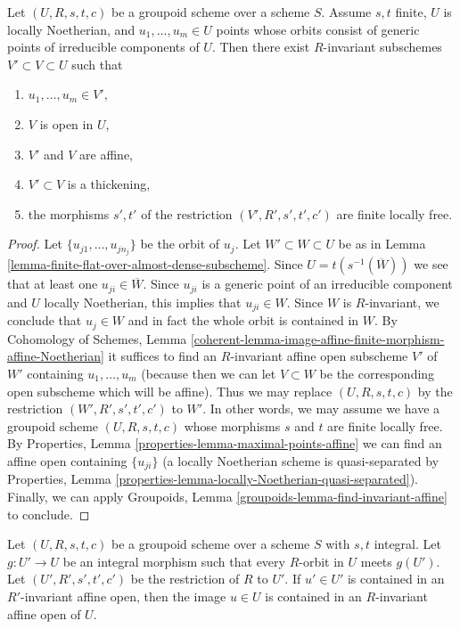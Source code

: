 \begin{lemma}
\label{lemma-invariant-affine-open-around-generic-point-Noetherian}
Let $(U, R, s, t, c)$ be a groupoid scheme over a scheme $S$.
Assume $s, t$ finite, $U$ is locally Noetherian, and $u_1, \ldots, u_m \in U$
points whose orbits consist of generic points of irreducible
components of $U$. Then there exist $R$-invariant subschemes
$V' \subset V \subset U$ such that
\begin{enumerate}
\item $u_1, \ldots, u_m \in V'$,
\item $V$ is open in $U$,
\item $V'$ and $V$ are affine,
\item $V' \subset V$ is a thickening,
\item the morphisms $s', t'$ of the restriction $(V', R', s', t', c')$
are finite locally free.
\end{enumerate}
\end{lemma}

\begin{proof}
Let $\{u_{j1}, \ldots, u_{jn_j}\}$ be the orbit of $u_j$.
Let $W' \subset W \subset U$ be as in
Lemma \ref{lemma-finite-flat-over-almost-dense-subscheme}.
Since $U = t(s^{-1}(\overline{W}))$ we see that at least
one $u_{ji} \in \overline{W}$. Since $u_{ji}$ is a generic point
of an irreducible component and $U$ locally Noetherian,
this implies that $u_{ji} \in W$. Since $W$ is $R$-invariant, we
conclude that $u_j \in W$ and in fact the whole orbit is contained in $W$.
By Cohomology of Schemes, Lemma
\ref{coherent-lemma-image-affine-finite-morphism-affine-Noetherian}
it suffices to find an $R$-invariant affine open subscheme $V'$
of $W'$ containing $u_1, \ldots, u_m$ (because then we can let $V \subset W$
be the corresponding open subscheme which will be affine).
Thus we may replace $(U, R, s, t, c)$
by the restriction $(W', R', s', t', c')$ to $W'$.
In other words, we may assume we have a groupoid scheme $(U, R, s, t, c)$
whose morphisms $s$ and $t$ are finite locally free.
By Properties, Lemma \ref{properties-lemma-maximal-points-affine}
we can find an affine open containing $\{u_{ji}\}$
(a locally Noetherian scheme is quasi-separated by
Properties, Lemma \ref{properties-lemma-locally-Noetherian-quasi-separated}).
Finally, we can apply
Groupoids, Lemma \ref{groupoids-lemma-find-invariant-affine}
to conclude.
\end{proof}

\begin{lemma}
\label{lemma-find-affine-integral}
Let $(U, R, s, t, c)$ be a groupoid scheme over a scheme $S$
with $s, t$ integral. Let $g : U' \to U$ be an integral morphism
such that every $R$-orbit in $U$ meets $g(U')$. Let $(U', R', s', t', c')$
be the restriction of $R$ to $U'$. If $u' \in U'$ is contained in an
$R'$-invariant affine open, then the image $u \in U$ is contained
in an $R$-invariant affine open of $U$.
\end{lemma}

